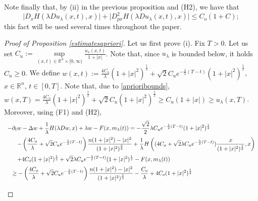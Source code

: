 \documentclass{amsart}
\theoremstyle{remark}
\theoremstyle{definition}
\theoremstyle{Claim}
\newcommand{\R}{\mathbb{R}}
\theoremstyle{plain}
\begin{document}
	Note finally that, by (ii) in the previous proposition and (H2), we have that
	\begin{equation}\label{H3}
		\lvert D_x H(\lambda Du_\lambda(x,t),x)\rvert+\lvert D^2_{px} H(\lambda Du_\lambda(x,t),x)\rvert\leq C_o(1+C);
	\end{equation}
	this fact will be used several times throughout the paper.
	
	\begin{proof}[Proof of Proposition \ref{estimatesapriori}]
		Let us first prove (i). Fix $T>0$. Let us set $C_{u}:=\underset{(x,t) \in \R^n \times [0,\infty)}{\sup}\frac{u_\lambda(x,t)}{1+\lvert x\rvert}$. Note that, since $u_\lambda$ is bounded below, it holds $C_u\geq 0$. We define $w(x,t):=\frac{4C_o}{\lambda}(1+\lvert x\rvert^2)^{\frac{1}{2}}+\sqrt{2}C_{u}e^{-\frac{\lambda}{2}(T-t)}(1+\lvert x\rvert^2)^{\frac{1}{2}}$, $x\in\mathbb{R}^n$, $t\in [0,T]$. Note that, due to \eqref{aprioribounds}, $w(x,T)=\frac{4C_o}{\lambda}(1+\lvert x\rvert^2)^{\frac{1}{2}}+\sqrt{2}C_u(1+\lvert x\rvert^2)^{\frac{1}{2}}\geq C_u(1+\lvert x\rvert)\geq u_\lambda(x,T)$. Moreover, using (F1) and (H2),
		$$\begin{array}{l}
			\vspace{0.2cm}\displaystyle{-\partial_t w-\Delta w+\frac{1}{\lambda}H(\lambda Dw,x)+\lambda w-F(x,m_\lambda(t))=-\frac{\sqrt{2}}{2}\lambda C_u e^{-\frac{\lambda}{2}(T-t)}(1+\lvert x\rvert^2)^{\frac{1}{2}}}\\
			\vspace{0.2cm}\displaystyle{\hspace{0.6cm}-\left(\frac{4C_o}{\lambda}+\sqrt{2}C_u e^{-\frac{\lambda}{2}(T-t)}\right)\frac{n(1+\lvert x\rvert^2)-\lvert x\rvert^2}{(1+\lvert x\rvert^2)^{\frac{3}{2}}}+\frac{1}{\lambda}H\left((4C_o+\sqrt{2}\lambda C_u e^{-\frac{\lambda}{2}(T-t)})\frac{x}{(1+\lvert x\rvert^2)^{\frac{1}{2}}},x\right)}\\
			\vspace{0.2cm}\displaystyle{\hspace{0.6cm}+4C_o(1+\lvert x\rvert^2)^{\frac{1}{2}}+\sqrt{2}\lambda C_u e^{-\frac{\lambda}{2}(T-t)}(1+\lvert x\rvert^2)^{\frac{1}{2}}-F(x,m_\lambda(t))}\\
			\vspace{0.2cm}\displaystyle{\hspace{0.3cm}\geq -\left(\frac{4C_o}{\lambda}+\sqrt{2}C_u e^{-\frac{\lambda}{2}(T-t)}\right)\frac{n(1+\lvert x\rvert^2)-\lvert x\rvert^2}{(1+\lvert x\rvert^2)^{\frac{3}{2}}}-\frac{C_o}{\lambda}+4C_o(1+\lvert x\rvert^2)^{\frac{1}{2}}}\\

\end{array}$$
\end{proof}
\end{document}
